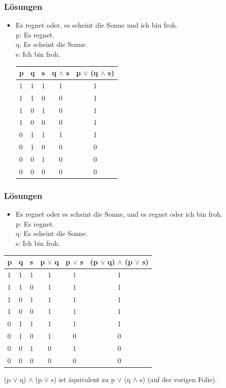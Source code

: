 \begin{frame}
\frametitle{Lösungen}

\begin{itemize}
\item[] Es regnet oder, es scheint die Sonne und ich bin froh.\\		
p: Es regnet.\\
q: Es scheint die Sonne.\\
s: Ich bin froh.

\bigskip

\begin{tabular}{l|l|l|c|c}
p & q & s & q $\land $ s & p $\lor$ (q $\land $ s) \\
\hline
1 & 1 & 1 & 1 & 1\\
\hline
1 & 1 & 0 & 0 & 1\\
\hline
1 & 0 & 1 & 0 & 1\\
\hline
1 & 0 & 0 & 0 & 1\\
\hline
0 & 1 & 1 & 1 & 1\\
\hline
0 & 1 & 0 & 0 & 0\\
\hline
0 & 0 & 1 & 0 & 0\\
\hline
0 & 0 & 0 & 0 & 0\\
\end{tabular}

\end{itemize}

\end{frame}

\begin{frame}
\frametitle{Lösungen}


\begin{itemize}
\item[] Es regnet oder es scheint die Sonne, und es regnet oder ich bin froh.\\
p: Es regnet.\\
q: Es scheint die Sonne.\\
s: Ich bin froh.
\end{itemize}
\begin{tabular}[b]{l|l|l|c|c|c}
p & q & s & p $ \lor $ q & p $ \lor $ s & (p $ \lor $ q) $ \land $ (p $ \lor $ s) \\
\hline
1 & 1 & 1 & 1 & 1 & 1\\
\hline
1 & 1 & 0 & 1 & 1 & 1\\
\hline
1 & 0 & 1 & 1 & 1 & 1\\
\hline
1 & 0 & 0 & 1 & 1 & 1\\
\hline
0 & 1 & 1 & 1 & 1 & 1\\
\hline
0 & 1 & 0 & 1 & 0 & 0\\
\hline
0 & 0 & 1 & 0 & 1 & 0\\
\hline
0 & 0 & 0 & 0 & 0 & 0\\

\end{tabular}

\bigskip

(p $ \lor $ q) $ \land $ (p $ \lor $ s) ist äquivalent zu p $\lor$ (q $\land $ s) (auf der vorigen Folie).

\end{frame}

